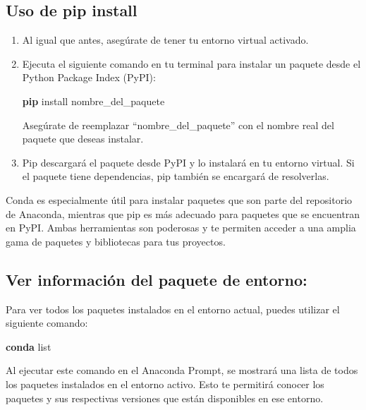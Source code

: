 \documentclass[
  a4paper,
]{article}
\newenvironment{Shaded}{}{}
\newcommand{\ExtensionTok}[1]{\textcolor[rgb]{0.84,0.23,0.29}{\textbf{#1}}}
\newcommand{\NormalTok}[1]{\textcolor[rgb]{0.14,0.16,0.18}{#1}}
\begin{document}
\hypertarget{uso-de-pip-install}{%
\subsection{Uso de pip install}\label{uso-de-pip-install}}

\begin{enumerate}
\def\labelenumi{\arabic{enumi}.}
\item
  Al igual que antes, asegúrate de tener tu entorno virtual activado.
\item
  Ejecuta el siguiente comando en tu terminal para instalar un paquete
  desde el Python Package Index (PyPI):

\begin{Shaded}
\begin{Highlighting}[]
\ExtensionTok{pip}\NormalTok{ install nombre\_del\_paquete}
\end{Highlighting}
\end{Shaded}

  Asegúrate de reemplazar ``nombre\_del\_paquete'' con el nombre real
  del paquete que deseas instalar.
\item
  Pip descargará el paquete desde PyPI y lo instalará en tu entorno
  virtual. Si el paquete tiene dependencias, pip también se encargará de
  resolverlas.
\end{enumerate}

Conda es especialmente útil para instalar paquetes que son parte del
repositorio de Anaconda, mientras que pip es más adecuado para paquetes
que se encuentran en PyPI. Ambas herramientas son poderosas y te
permiten acceder a una amplia gama de paquetes y bibliotecas para tus
proyectos.

\hypertarget{ver-informaciuxf3n-del-paquete-de-entorno}{%
\subsection{Ver información del paquete de
entorno:}\label{ver-informaciuxf3n-del-paquete-de-entorno}}

Para ver todos los paquetes instalados en el entorno actual, puedes
utilizar el siguiente comando:

\begin{Shaded}
\begin{Highlighting}[]
\ExtensionTok{conda}\NormalTok{ list}
\end{Highlighting}
\end{Shaded}

Al ejecutar este comando en el Anaconda Prompt, se mostrará una lista de
todos los paquetes instalados en el entorno activo. Esto te permitirá
conocer los paquetes y sus respectivas versiones que están disponibles
en ese entorno.
\end{document}
